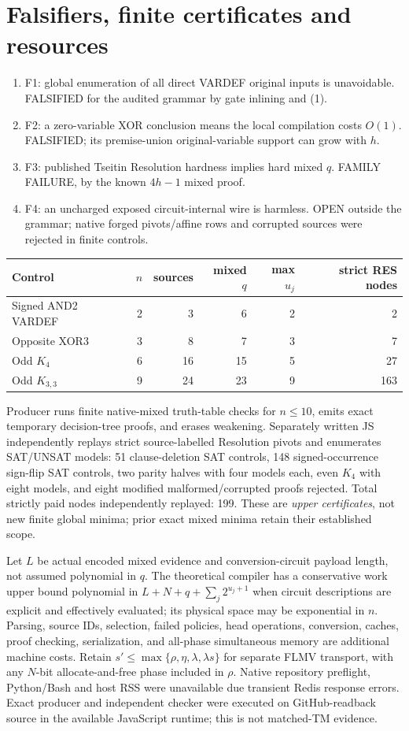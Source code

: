 \documentclass[11pt]{article}
\begin{document}
\section*{Falsifiers, finite certificates and resources}
\begin{enumerate}
\item[] F1: global enumeration of all direct VARDEF original inputs is unavoidable. FALSIFIED for the audited grammar by gate inlining and (1).
\item[] F2: a zero-variable XOR conclusion means the local compilation costs $O(1)$. FALSIFIED; its premise-union original-variable support can grow with $h$.
\item[] F3: published Tseitin Resolution hardness implies hard mixed $q$. FAMILY FAILURE, by the known $4h-1$ mixed proof.
\item[] F4: an uncharged exposed circuit-internal wire is harmless. OPEN outside the grammar; native forged pivots/affine rows and corrupted sources were rejected in finite controls.
\end{enumerate}
\begin{center}
\begin{tabular}{lrrrrr}\toprule
Control & $n$ & sources & mixed $q$ & max $u_j$ & strict RES nodes\\\midrule
Signed AND2 VARDEF &2&3&6&2&2\\
Opposite XOR3 &3&8&7&3&7\\
Odd $K_4$ &6&16&15&5&27\\
Odd $K_{3,3}$ &9&24&23&9&163\\\bottomrule
\end{tabular}
\end{center}
Producer runs finite native-mixed truth-table checks for $n\le10$, emits exact temporary decision-tree proofs, and erases weakening. Separately written JS independently replays strict source-labelled Resolution pivots and enumerates SAT/UNSAT models: 51 clause-deletion SAT controls, 148 signed-occurrence sign-flip SAT controls, two parity halves with four models each, even $K_4$ with eight models, and eight modified malformed/corrupted proofs rejected. Total strictly paid nodes independently replayed: 199. These are \emph{upper certificates}, not new finite global minima; prior exact mixed minima retain their established scope.

Let $L$ be actual encoded mixed evidence and conversion-circuit payload length, not assumed polynomial in $q$. The theoretical compiler has a conservative work upper bound polynomial in $L+N+q+\sum_j2^{u_j+1}$ when circuit descriptions are explicit and effectively evaluated; its physical space may be exponential in $n$. Parsing, source IDs, selection, failed policies, head operations, conversion, caches, proof checking, serialization, and all-phase simultaneous memory are additional machine costs. Retain $s'\le\max\{\rho,\eta,\lambda,\lambda s\}$ for separate FLMV transport, with any $N$-bit allocate-and-free phase included in $\rho$. Native repository preflight, Python/Bash and host RSS were unavailable due transient Redis response errors. Exact producer and independent checker were executed on GitHub-readback source in the available JavaScript runtime; this is not matched-TM evidence.
\end{document}
